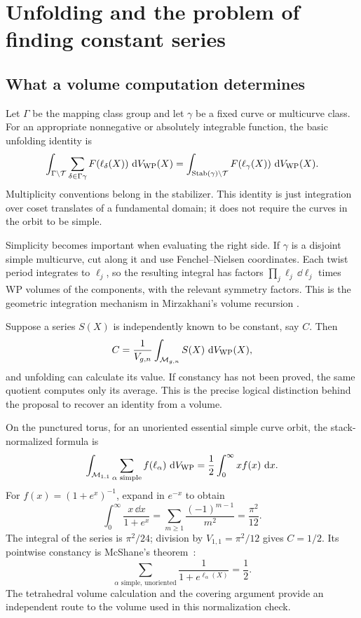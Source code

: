\section{Unfolding and the problem of finding constant series}
\label{sec:unfolding}

\subsection{What a volume computation determines}

Let $\Gamma$ be the mapping class group and let $\gamma$ be a fixed curve
or multicurve class. For an appropriate nonnegative or absolutely integrable
function, the basic unfolding identity is
\begin{equation}
 \int_{\Gamma\backslash\mathcal T}
 \sum_{\delta\in\Gamma\gamma}F(\ell_\delta(X))\,\mathop{}\!\mathrm d V_{\mathrm{WP}}(X)
 =\int_{\operatorname{Stab}(\gamma)\backslash\mathcal T}
             F(\ell_\gamma(X))\,\mathop{}\!\mathrm d V_{\mathrm{WP}}(X).
 \label{eq:unfold}
\end{equation}
Multiplicity conventions belong in the stabilizer. This identity is just
integration over coset translates of a fundamental domain; it does not
require the curves in the orbit to be simple.

Simplicity becomes important when evaluating the right side. If $\gamma$
is a disjoint simple multicurve, cut along it and use Fenchel--Nielsen
coordinates. Each twist period integrates to $\ell_j$, so the resulting
integral has factors $\prod_j\ell_j\,\dd\ell_j$ times WP volumes of the
components, with the relevant symmetry factors. This is the geometric
integration mechanism in Mirzakhani's volume recursion
\cite[Theorem 8.1]{MirzVolumes}.

Suppose a series $S(X)$ is independently known to be constant, say $C$.
Then
\begin{equation}
 C=\frac{1}{V_{g,n}}
       \int_{\mathcal M_{g,n}}S(X)\,\mathop{}\!\mathrm d V_{\mathrm{WP}}(X),
 \label{eq:recoverconstant}
\end{equation}
and unfolding can calculate its value. If constancy has not been proved,
the same quotient computes only its average. This is the precise logical
distinction behind the proposal to recover an identity from a volume.

On the punctured torus, for an unoriented essential simple curve orbit,
the stack-normalized formula is
\begin{equation}
 \int_{\mathcal M_{1,1}}\sum_{\alpha\text{ simple}}f(\ell_\alpha)\,\mathop{}\!\mathrm d V_{\mathrm{WP}}
       =\frac12\int_0^\infty x f(x)\,\mathop{}\!\mathrm d x.
 \label{eq:torusunfold}
\end{equation}
For $f(x)=(1+e^x)^{-1}$, expand in $e^{-x}$ to obtain
\[
 \int_0^\infty\frac{x\,\dd x}{1+e^x}
   =\sum_{m\ge1}\frac{(-1)^{m-1}}{m^2}=\frac{\pi^2}{12}.
\]
The integral of the series is $\pi^2/24$; division by
$V_{1,1}=\pi^2/12$ gives $C=1/2$. Its pointwise constancy is McShane's
theorem~\cite{McShane}:
\begin{equation}
 \sum_{\alpha\text{ simple, unoriented}}
                 \frac{1}{1+e^{\ell_\alpha(X)}}=\frac12.
 \label{eq:mcshane}
\end{equation}
The tetrahedral volume calculation and the covering argument provide an
independent route to the volume used in this normalization check.


